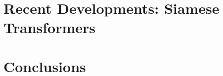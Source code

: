 \begin{table}[htb]
	\centering
	\caption[Results comparison for BIOSSES with top results]{Results for BIOSSES dataset with different variants of Siamese Neural Network compared with top results reported for BIOSSES. For each variant, Pearson Correlation ($\bm{\rho}$) is reported between the predicted values and the gold labels of the test set. }  
	\label{tab:biosses_transformers_all}
\end{table}

\section{Recent Developments: Siamese Transformers}

\section{Conclusions}